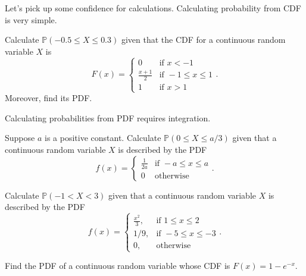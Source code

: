 \documentclass[../main.tex]{subfiles}
\begin{document}
Let's pick up some confidence for calculations.  Calculating probability from CDF is very simple.
\begin{example} \label{ex:crv-from-cdf}
  Calculate \(\mathbb{P}(-0.5 \le X \le 0.3)\) given that the CDF for a continuous random variable \(X\) is 
  \[
    F(x) = 
    \begin{cases}
      0 & \text{if } x < -1 \\
      \frac{x + 1}{2} & \text{if } -1 \le x \le 1 \\
      1 & \text{if } x > 1
    \end{cases}.
  \]
  Moreover, find its PDF.

\end{example}

Calculating probabilities from PDF requires integration.
\begin{example} \label{ex:crv-from-pdf}
  Suppose \(a\) is a positive constant. Calculate \(\mathbb{P}( 0 \le X \le a/3 )\) given that a continuous random variable \(X\) is described by the PDF
  \[
    f(x) = 
    \begin{cases}
      \frac{1}{2a} & \text{if } -a \le x \le a \\
      0 & \text{otherwise}
    \end{cases}.
  \]

  \blanks*
\end{example}


\clearpage
\begin{exercise} \label{ex:crv-piecewise-pdf}
  Calculate \(\mathbb{P}(-1 < X < 3)\) given that a continuous random variable \(X\) is described by the PDF
  \[
    f(x) = 
    \begin{cases}
      \frac{x^{2}}{3}, & \text{if } 1 \le x \le 2 \\
      1/9, & \text{if } -5 \le x \le -3 \\
      0, &\text{otherwise}
    \end{cases}.
  \]

\end{exercise}

\begin{exercise} \label{ex:crv-pdf-from-cdf}
  Find the PDF of a continuous random variable whose CDF is \(F(x) = 1 - e^{-x}\).

\end{exercise}
\end{document}
